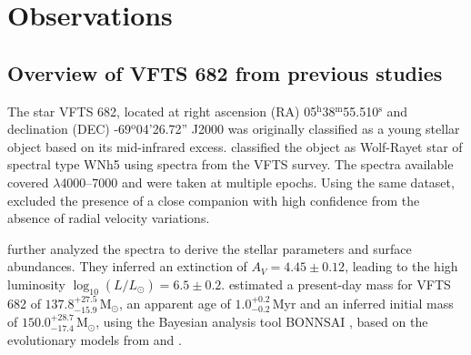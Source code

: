 \documentclass[a4paper,fleqn,usenatbib]{mnras}
\newcommand{\Msun}{{\,\mathrm{M}_\odot}}
\DeclareRobustCommand{\Tabref}[1]{Table~\ref{#1}}
\begin{document}

\section{Observations}
\label{sec:sample}

\subsection{ Overview of VFTS 682 from previous studies \label{data:vfts683}}

The star VFTS 682, located at right ascension (RA)
05$^\mathrm{h}$38$^\mathrm{m}$55.510$^\mathrm{s}$  and declination
(DEC) \mbox{-69$^\mathrm{o}$04'26.72''} J2000 \citep[][see also
\Tabref{tab:vfts682} for the coordinates from \emph{Gaia} DR2]{evans:11}
was originally classified as a young stellar object \citep{gruendl:09}
based on its mid-infrared excess. \citet{evans:11} classified the
object as Wolf-Rayet star of spectral type WNh5 using spectra from the
VFTS survey. The spectra available covered $\lambda$4000--7000 and
were taken at multiple epochs. Using the same dataset,
\citet{bestenlehner:11} excluded the presence of a close companion
with high confidence from the absence of radial velocity variations.

\citet{bestenlehner:11} further analyzed the spectra %
to derive the stellar
parameters and surface abundances. They inferred an extinction
of $A_V=4.45\pm0.12$, leading to the high luminosity
$\log_{10}(L/L_\odot) =  6.5\pm0.2$. \citet{schneider:18} estimated
a present-day mass for VFTS 682 of $137.8^{+27.5}_ {-15.9}\Msun$, an
apparent age of $1.0^{+0.2}_{-0.2}$\,Myr and an inferred initial mass
of $150.0^{+28.7}_{-17.4}\Msun$, using the Bayesian analysis tool BONNSAI
\citep{schneider:17}, based on the evolutionary models from
\citet{brott:11} and \cite{kohler:15}. %
\end{document}
